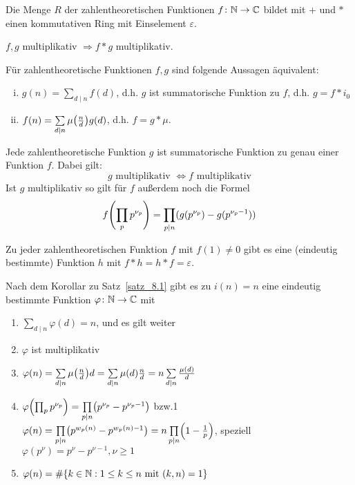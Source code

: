 	Die Menge $R$ der zahlentheoretischen Funktionen $f \colon \mathbb{N} \rightarrow \mathbb{C}$ bildet mit $+$ und $*$ einen kommutativen Ring mit Einselement $\varepsilon$.

\begin{falko} \label{F8.5}
	$f,g$ multiplikativ $\Rightarrow f * g$ multiplikativ.
\end{falko}

\begin{satz} \label{satz_8.1}
	Für zahlentheoretische Funktionen $f,g$ sind folgende Aussagen äquivalent:  \begin{enumerate}[(i)]
		\item $g(n) = \sum\limits_{d \mid n} f(d)$, d.h. $g$ ist summatorische Funktion zu $f$, d.h. $g = f * i_0$
		\item $f(n) = \sum\limits_{d \mid n} \mu\enbrace*{\frac{n}{d}} g(d)$, d.h. $f = g * \mu$.
	\end{enumerate}
\end{satz}

	Jede zahlentheoretische Funktion $g$ ist summatorische Funktion zu genau einer Funktion $f$. Dabei gilt:
	\[ g \text{ multiplikativ } \Leftrightarrow f \text{ multiplikativ} \]
	Ist $g$ multiplikativ so gilt für $f$ außerdem noch die Formel
	\[ f \enbrace*{\prod_p p^{\nu_p}} = \prod\limits_{p \mid n} (g(p^{\nu_p}) - g(p^{\nu_p - 1})) \]
	
	Zu jeder zahlentheoretischen Funktion $f$ mit $f(1) \neq 0$ gibt es eine (eindeutig bestimmte) Funktion $h$ mit $f * h = h * f = \varepsilon$.
	
	Nach dem Korollar zu Satz~\ref{satz_8.1} gibt es zu $i(n) = n$ eine eindeutig bestimmte Funktion $\varphi\colon \mathbb{N} \rightarrow \mathbb{C}$ mit \begin{enumerate}[(1)]
		\item $\sum\limits_{d \mid n} \varphi(d) = n$, und es gilt weiter
		\item $\varphi$ ist multiplikativ
		\item $\varphi(n) = \sum\limits_{d \mid n} \mu\enbrace*{\frac{n}{d}}d = \sum\limits_{d \mid n} \mu(d) \frac{n}{d} = n \sum\limits_{d \mid n} \frac{\mu(d)}{d}$
		\item $\varphi\enbrace*{\prod_p p^{\nu_p}} = \prod\limits_{p \mid n} \enbrace*{p^{\nu_p} - p^{\nu_p - 1}}$ bzw.1
		$\varphi(n) = \prod\limits_{p \mid n} \enbrace*{p^{w_p(n)} - p^{w_p(n)-1}} = n \prod\limits_{p \mid n} \enbrace*{1 - \frac{1}{p}}$, speziell \\
		$\varphi(p^\nu) = p^\nu - p^{\nu-1}, \nu \geq 1$
		\item $\varphi(n) = \# \{k \in \mathbb{N} : 1 \leq k \leq n \text{ mit } (k,n)=1\}$
	\end{enumerate}
	
